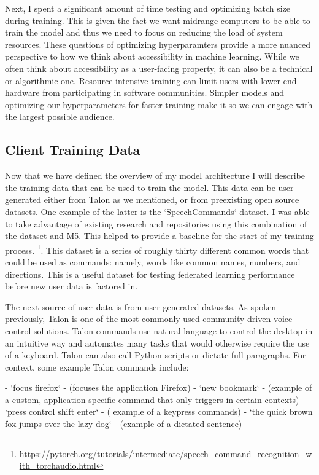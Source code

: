 \documentclass[manuscript,screen,review]{acmart}
\begin{document}
Next, I spent a significant amount of time testing and optimizing batch size during training. This is given the fact we want midrange computers to be able to train the model and thus we need to focus on reducing the load of system resources. These questions of optimizing hyperparamters provide a more nuanced perspective to how we think about accessibility in machine learning. While we often think about accessibility as a user-facing property, it can also be a technical or algorithmic one. Resource intensive training can limit users with lower end hardware from participating in software communities. Simpler models and optimizing our hyperparameters for faster training make it so we can engage with the largest possible audience.

\subsection{Client Training Data}

Now that we have defined the overview of my model architecture I will describe the training data that can be used to train the model. This data can be user generated either from Talon as we mentioned, or from preexisting open source datasets. One example of the latter is the `SpeechCommands` dataset. I was able to take advantage of existing research and repositories using this combination of the dataset and M5. This helped to provide a baseline for the start of my training process. \footnote{\url{https://pytorch.org/tutorials/intermediate/speech_command_recognition_with_torchaudio.html}}. This dataset is a series of roughly thirty different common words that could be used as commands: namely, words like common names, numbers, and directions. This is a useful dataset for testing federated learning performance before new user data is factored in.

The next source of user data is from user generated datasets. As spoken previously, Talon is one of the most commonly used community driven voice control solutions. Talon commands use natural language to control the desktop in an intuitive way and automates many tasks that would otherwise require the use of a keyboard. Talon can also call Python scripts or dictate full paragraphs. For context, some example Talon commands include:

- `focus firefox`
  - (focuses the application Firefox)
- `new bookmark`
  - (example of a custom, application specific command that only triggers in certain contexts)
- `press control shift enter`
  - ( example of a keypress commands)
- `the quick brown fox jumps over the lazy dog`
  - (example of a dictated sentence)
\end{document}
